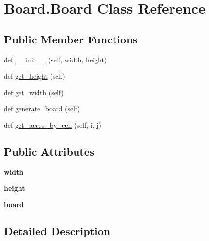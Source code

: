 \hypertarget{class_board_1_1_board}{}\section{Board.\+Board Class Reference}
\label{class_board_1_1_board}
\subsection*{Public Member Functions}
\begin{DoxyCompactItemize}
\item 
def \hyperlink{class_board_1_1_board_a4e5fe775dd732dca12ba2f24f5e33cd0}{\+\_\+\+\_\+init\+\_\+\+\_\+} (self, width, height)
\item 
def \hyperlink{class_board_1_1_board_a6134b116a4421868d9b70a90cae3cf6a}{get\+\_\+height} (self)
\item 
def \hyperlink{class_board_1_1_board_a5461757505c80b532af77cc6a651c7a7}{get\+\_\+width} (self)
\item 
def \hyperlink{class_board_1_1_board_a6c6aa64d586b48c8cbf7942a28ef4fba}{generate\+\_\+board} (self)
\item 
def \hyperlink{class_board_1_1_board_a8c672c7842189de03079a86c757244d7}{get\+\_\+acces\+\_\+by\+\_\+cell} (self, i, j)
\end{DoxyCompactItemize}
\subsection*{Public Attributes}
\begin{DoxyCompactItemize}
\item 
\mbox{\label{class_board_1_1_board_a354a175ae1f399098ac23ed37c58a3f2}} 
{\bfseries width}
\item 
\mbox{\label{class_board_1_1_board_a288daa852b69c17ecbabab9af6dac15a}} 
{\bfseries height}
\item 
\mbox{\label{class_board_1_1_board_ad18dab28d51fbe8bbf93036546741a0b}} 
{\bfseries board}
\end{DoxyCompactItemize}


\subsection{Detailed Description}


